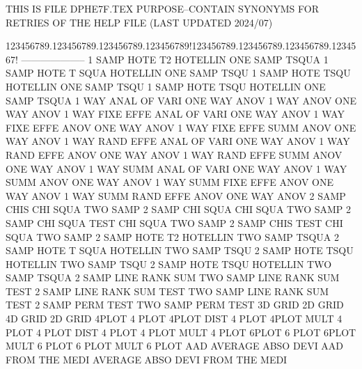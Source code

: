 THIS IS FILE DPHE7F.TEX
PURPOSE--CONTAIN SYNONYMS FOR RETRIES OF THE HELP FILE (LAST UPDATED 2024/07)
 
123456789.123456789.123456789.123456789!123456789.123456789.123456789.1234567!
--------------------
1        SAMP HOTE T2                   HOTELLIN ONE  SAMP TSQUA
1        SAMP HOTE T    SQUA            HOTELLIN ONE  SAMP TSQU
1        SAMP HOTE TSQU                 HOTELLIN ONE  SAMP TSQU
1        SAMP HOTE TSQU                 HOTELLIN ONE  SAMP TSQUA
1        WAY  ANAL OF   VARI            ONE      WAY  ANOV
1        WAY  ANOV                      ONE      WAY  ANOV
1        WAY  FIXE EFFE ANAL OF   VARI  ONE      WAY  ANOV
1        WAY  FIXE EFFE ANOV            ONE      WAY  ANOV
1        WAY  FIXE EFFE SUMM ANOV       ONE      WAY  ANOV
1        WAY  RAND EFFE ANAL OF   VARI  ONE      WAY  ANOV
1        WAY  RAND EFFE ANOV            ONE      WAY  ANOV
1        WAY  RAND EFFE SUMM ANOV       ONE      WAY  ANOV
1        WAY  SUMM ANAL OF   VARI       ONE      WAY  ANOV
1        WAY  SUMM ANOV                 ONE      WAY  ANOV
1        WAY  SUMM FIXE EFFE ANOV       ONE      WAY  ANOV
1        WAY  SUMM RAND EFFE ANOV       ONE      WAY  ANOV
2        SAMP CHIS                      CHI      SQUA TWO  SAMP
2        SAMP CHI  SQUA                 CHI      SQUA TWO  SAMP
2        SAMP CHI  SQUA TEST            CHI      SQUA TWO  SAMP
2        SAMP CHIS TEST                 CHI      SQUA TWO  SAMP
2        SAMP HOTE T2                   HOTELLIN TWO  SAMP TSQUA
2        SAMP HOTE T    SQUA            HOTELLIN TWO  SAMP TSQU
2        SAMP HOTE TSQU                 HOTELLIN TWO  SAMP TSQU
2        SAMP HOTE TSQU                 HOTELLIN TWO  SAMP TSQUA
2        SAMP LINE RANK SUM             TWO      SAMP LINE RANK SUM TEST
2        SAMP LINE RANK SUM  TEST       TWO      SAMP LINE RANK SUM TEST
2        SAMP PERM TEST                 TWO      SAMP PERM TEST
3D       GRID                           2D       GRID
4D       GRID                           2D       GRID
4PLOT                                   4        PLOT
4PLOT    DIST                           4        PLOT
4PLOT    MULT                           4        PLOT
4        PLOT DIST                      4        PLOT
4        PLOT MULT                      4        PLOT
6PLOT                                   6        PLOT
6PLOT    MULT                           6        PLOT
6        PLOT MULT                      6        PLOT
AAD                                     AVERAGE  ABSO DEVI
AAD      FROM THE  MEDI                 AVERAGE  ABSO DEVI FROM THE  MEDI
